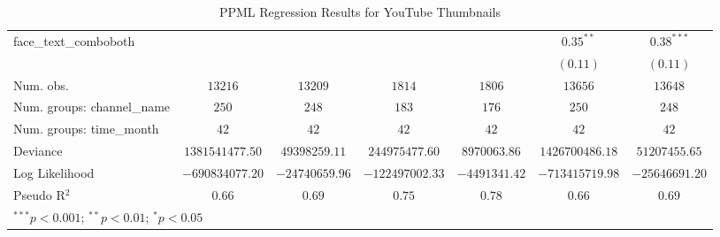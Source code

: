 \begin{table}
\begin{center}
\begin{tabular}{l c c c c c c}
face\_text\_comboboth       &                 &                &                 &               & $0.35^{**}$     & $0.38^{***}$   \\
                            &                 &                &                 &               & $(0.11)$        & $(0.11)$       \\
\hline
Num. obs.                   & $13216$         & $13209$        & $1814$          & $1806$        & $13656$         & $13648$        \\
Num. groups: channel\_name  & $250$           & $248$          & $183$           & $176$         & $250$           & $248$          \\
Num. groups: time\_month    & $42$            & $42$           & $42$            & $42$          & $42$            & $42$           \\
Deviance                    & $1381541477.50$ & $49398259.11$  & $244975477.60$  & $8970063.86$  & $1426700486.18$ & $51207455.65$  \\
Log Likelihood              & $-690834077.20$ & $-24740659.96$ & $-122497002.33$ & $-4491341.42$ & $-713415719.98$ & $-25646691.20$ \\
Pseudo R$^2$                & $0.66$          & $0.69$         & $0.75$          & $0.78$        & $0.66$          & $0.69$         \\
\hline
\multicolumn{7}{l}{\scriptsize{$^{***}p<0.001$; $^{**}p<0.01$; $^{*}p<0.05$}}
\end{tabular}
\caption{PPML Regression Results for YouTube Thumbnails}
\label{tab:ppml_results}
\end{center}
\end{table}
